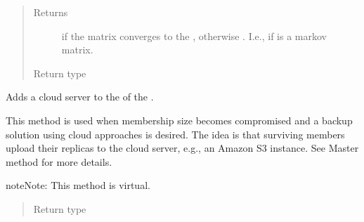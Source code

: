 \documentclass[letterpaper,10pt,english]{sphinxmanual}
\begin{document}
\begin{fulllineitems}
\begin{fulllineitems}
\begin{quote}
\begin{description}
\item[{Returns}] \leavevmode
{} if the matrix converges to the ,
otherwise . I.e., if  is a
markov matrix.

\item[{Return type}] \leavevmode
{}

\end{description}\end{quote}

\end{fulllineitems}


\begin{fulllineitems}
\label{\detokenize{app.domain:app.domain.cluster_groups.SGCluster.add_cloud_reference}}
Adds a cloud server to the {\hyperref[\detokenize{app.domain:app.domain.cluster_groups.Cluster.members}]{}} of
the .

This method is used when  membership size becomes
compromised and a backup solution using cloud approaches is desired.
The idea is that surviving members upload their replicas to the cloud
server, e.g., an Amazon S3 instance. See Master method
{\hyperref[\detokenize{app.domain:app.domain.master_servers.SGMaster.get_cloud_reference}]{}}
for more details.

\begin{sphinxadmonition}{note}{Note:}
This method is virtual.
\end{sphinxadmonition}
\begin{quote}\begin{description}
\item[{Return type}] \leavevmode
{}

\end{description}\end{quote}

\end{fulllineitems}


\end{fulllineitems}
\end{document}
